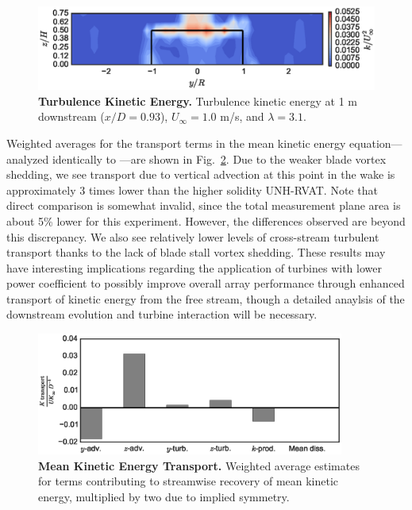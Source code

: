 \documentclass[10pt,letterpaper]{article}
\begin{document}
\begin{figure}[h]
\includegraphics[width=\textwidth]{figures/k_contours}
\caption{{\bf Turbulence Kinetic Energy.}
Turbulence kinetic energy at 1 m downstream ($x/D=0.93$), $U_\infty=1.0$ m/s, and
$\lambda=3.1$.}
\label{fig:kcont}
\end{figure}


Weighted averages for the transport terms in the mean kinetic energy
equation---analyzed identically to \cite{Bachant2015-JoT}---are shown in
Fig.~\ref{fig:Ktransport}. Due to the weaker blade vortex shedding, we see
transport due to vertical advection at this point in the wake is approximately 3
times lower than the higher solidity UNH-RVAT. Note that direct comparison is
somewhat invalid, since the total measurement plane area is about 5\% lower for
this experiment. However, the differences observed are beyond this discrepancy.
We also see relatively lower levels of cross-stream turbulent transport thanks
to the lack of blade stall vortex shedding. These results may have interesting
implications regarding the application of turbines with lower power coefficient
to possibly improve overall array performance through enhanced transport of
kinetic energy from the free stream, though a detailed anaylsis of the
downstream evolution and turbine interaction will be necessary.

\begin{figure}[ht!]
\includegraphics[width=0.9\textwidth]{figures/K_trans_bar_graph}

\caption{{\bf Mean Kinetic Energy Transport.} Weighted average estimates for
    terms contributing to streamwise recovery of mean kinetic energy, multiplied by
    two due to implied symmetry.}

\label{fig:Ktransport}
\end{figure}
\end{document}
